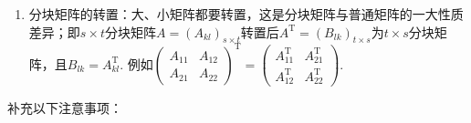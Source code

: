 \begin{enumerate}
    \item 分块矩阵的转置：大、小矩阵都要转置，这是分块矩阵与普通矩阵的一大性质差异；即$s \times t$分块矩阵$A=(A_{kl})_{s \times t}$转置后$A^\mathrm{T}=(B_{lk})_{t \times s}$为$t \times s$分块矩阵，且$B_{lk}=A_{kl}^\mathrm{T}$. 例如$\begin{pmatrix}
                  A_{11} & A_{12} \\ A_{21} & A_{22}
              \end{pmatrix}^\mathrm{T}=\begin{pmatrix}
                  A_{11}^\mathrm{T} & A_{21}^\mathrm{T} \\ A_{12}^\mathrm{T} & A_{22}^\mathrm{T}
              \end{pmatrix}$.
\end{enumerate}

补充以下注意事项：
